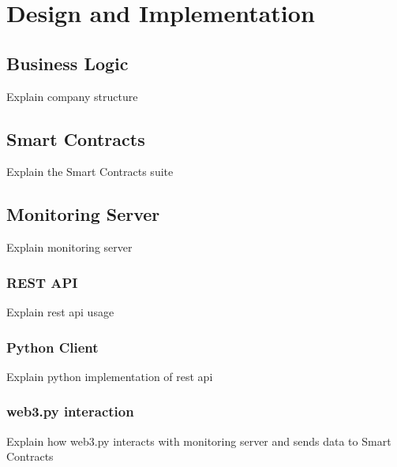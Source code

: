 \chapter{Design and Implementation}
\section{Business Logic}
Explain company structure

\section{Smart Contracts}
Explain the Smart Contracts suite
% 


\section{Monitoring Server}
Explain monitoring server
\subsection{REST API} 
Explain rest api usage 
\subsection{Python Client}
Explain python implementation of rest api
\subsection{web3.py interaction}
Explain how web3.py interacts with monitoring server and sends data to Smart Contracts
